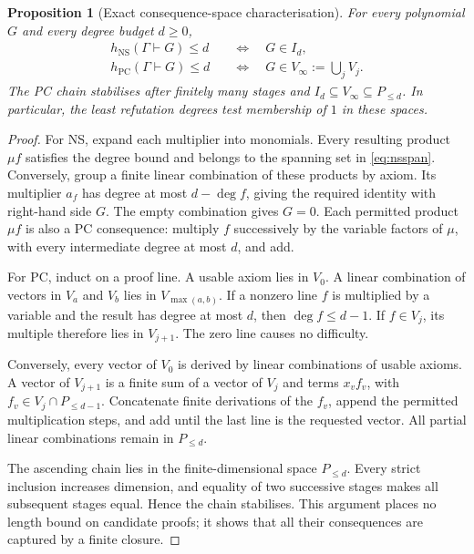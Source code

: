 \documentclass[11pt,a4paper]{article}
\newtheorem{proposition}[theorem]{Proposition}
\theoremstyle{definition}\newtheorem{definition}[theorem]{Definition}
\theoremstyle{remark}\newtheorem{remark}[theorem]{Remark}
\newcommand{\NS}{\mathrm{NS}}\newcommand{\PC}{\mathrm{PC}}
\begin{document}
\begin{proposition}[Exact consequence-space characterisation]\label{prop:pc-closure}
For every polynomial $G$ and every degree budget $d\ge0$,
\[
 \begin{aligned}
 h_{\NS}(\Gamma\vdash G)\le d&\quad\Longleftrightarrow\quad G\in I_d,\\
 h_{\PC}(\Gamma\vdash G)\le d&\quad\Longleftrightarrow\quad
                       G\in V_\infty:=\bigcup_jV_j.
 \end{aligned}
\]
The PC chain stabilises after finitely many stages and
$I_d\subseteq V_\infty\subseteq P_{\le d}$. In particular, the least
refutation degrees test membership of $1$ in these spaces.
\end{proposition}
\begin{proof}
For NS, expand each multiplier into monomials. Every resulting product
$\mu f$ satisfies the degree bound and belongs to the spanning set in
\eqref{eq:nsspan}. Conversely, group a finite linear combination of
these products by axiom. Its multiplier $a_f$ has degree at most
$d-\deg f$, giving the required identity with right-hand side $G$.
The empty combination gives $G=0$. Each permitted product $\mu f$ is
also a PC consequence: multiply $f$ successively by the variable
factors of $\mu$, with every intermediate degree at most $d$, and add.

For PC, induct on a proof line. A usable axiom lies in $V_0$. A linear
combination of vectors in $V_a$ and $V_b$ lies in $V_{\max(a,b)}$.
If a nonzero line $f$ is multiplied by a variable and the result has
degree at most $d$, then $\deg f\le d-1$. If $f\in V_j$, its multiple
therefore lies in $V_{j+1}$. The zero line causes no difficulty.

Conversely, every vector of $V_0$ is derived by linear combinations of
usable axioms. A vector of $V_{j+1}$ is a finite sum of a vector of
$V_j$ and terms $x_vf_v$, with $f_v\in V_j\cap P_{\le d-1}$.
Concatenate finite derivations of the $f_v$, append the permitted
multiplication steps, and add until the last line is the requested
vector. All partial linear combinations remain in $P_{\le d}$.

The ascending chain lies in the finite-dimensional space $P_{\le d}$.
Every strict inclusion increases dimension, and equality of two
successive stages makes all subsequent stages equal. Hence the chain
stabilises. This argument places no length bound on candidate proofs;
it shows that all their consequences are captured by a finite closure.
\end{proof}
\end{document}
